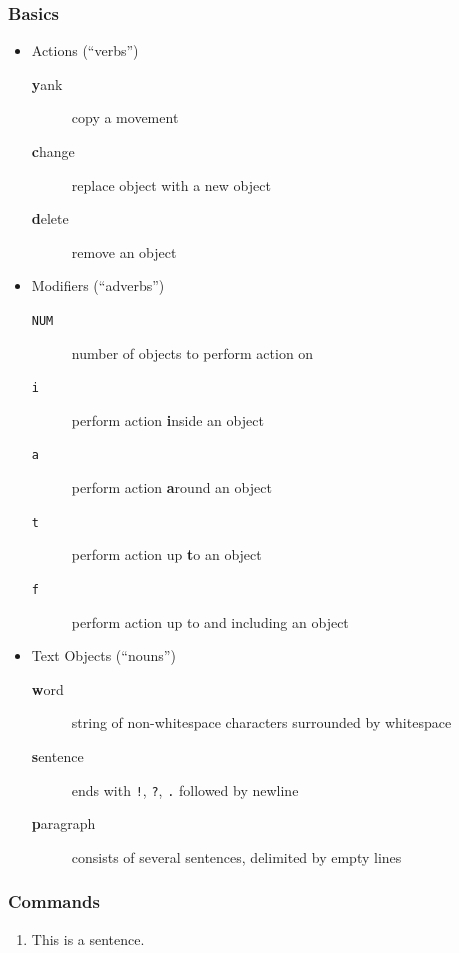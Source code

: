 \documentclass{beamer}
\begin{document}
\begin{frame}
    \frametitle{Basics}
    \begin{itemize}
        \item Actions (``verbs'')
            \begin{description}
                \item [\textbf{y}ank]   copy a movement
                \item [\textbf{c}hange] replace object with a new object
                \item [\textbf{d}elete] remove an object
            \end{description}
        \item Modifiers (``adverbs'')
            \begin{description}
                \item [\texttt{NUM}] number of objects to perform action on
                \item [\texttt{i}]   perform action \textbf{i}nside an object
                \item [\texttt{a}]   perform action \textbf{a}round an object
                \item [\texttt{t}]   perform action up \textbf{t}o an object
                \item [\texttt{f}]   perform action up to and including an object
            \end{description}
        \item Text Objects (``nouns'')
            \begin{description}
                \item [\textbf{w}ord]      string of non-whitespace characters surrounded by whitespace
                \item [\textbf{s}entence]  ends with \texttt{!}, \texttt{?}, \texttt{.} followed by newline
                \item [\textbf{p}aragraph] consists of several sentences, delimited by empty lines
            \end{description}
    \end{itemize}
\end{frame}
\begin{frame}
    \frametitle{Commands}
    \begin{enumerate}
        \item This is a sentence.
    \end{enumerate}
\end{frame}
\end{document}
